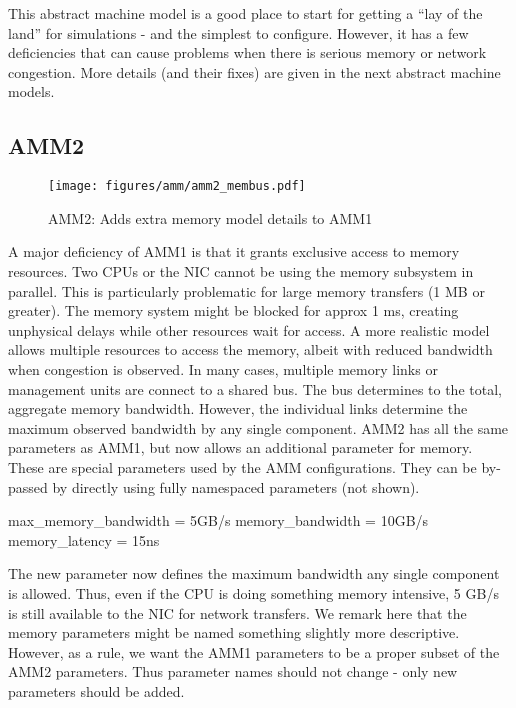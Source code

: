 This abstract machine model is a good place to start for getting a ``lay of the land'' for simulations - and the simplest to configure.
However, it has a few deficiencies that can cause problems when there is serious memory or network congestion.
More details (and their fixes) are given in the next abstract machine models. 	

\subsection{AMM2}

\begin{figure}
\begin{center}
\texttt{[image: figures/amm/amm2\_membus.pdf]}
\end{center}
\caption{AMM2: Adds extra memory model details to AMM1}
\label{fig:amm2}
\end{figure}

\label{subsec:ammTwo}
A major deficiency of AMM1 is that it grants exclusive access to memory resources.
Two CPUs or the NIC cannot be using the memory subsystem in parallel.
This is particularly problematic for large memory transfers (1 MB or greater).
The memory system might be blocked for approx 1 ms,
creating unphysical delays while other resources wait for access.
A more realistic model allows multiple resources to access the memory,
albeit with reduced bandwidth when congestion is observed.
In many cases, multiple memory links or management units are connect to a shared bus.
The bus determines to the total, aggregate memory bandwidth.
However, the individual links determine the maximum observed bandwidth by any single component.
AMM2 has all the same parameters as AMM1, but now allows an additional parameter for memory.
These are special parameters used by the AMM configurations.
They can be by-passed by directly using fully namespaced parameters (not shown).

\begin{ViFile}
max_memory_bandwidth = 5GB/s
memory_bandwidth = 10GB/s
memory_latency = 15ns
\end{ViFile}
The new parameter  now defines the maximum bandwidth any single component is allowed.
Thus, even if the CPU is doing something memory intensive, 5 GB/s is still available to the NIC for network transfers.
We remark here that the memory parameters might be named something slightly more descriptive.
However, as a rule, we want the AMM1 parameters to be a proper subset of the AMM2 parameters.
Thus parameter names should not change - only new parameters should be added.


